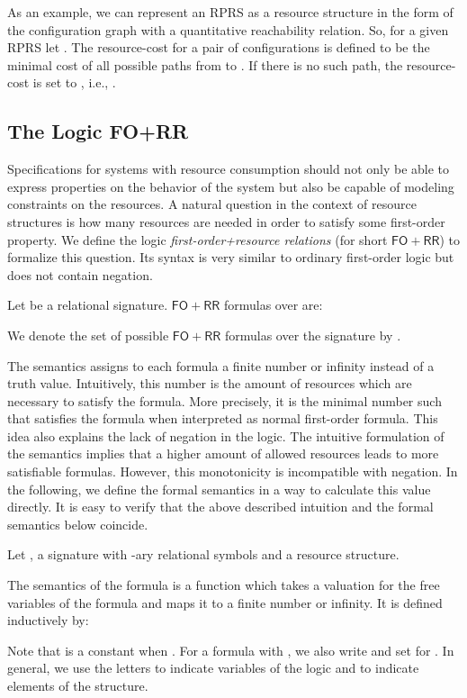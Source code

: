 \documentclass{LMCS}
\newcommand{\FORR}{\ensuremath{\mathsf{FO\!\!+\!\!RR}}}
\newcommand{\RPRS}{\textsf{RPRS}}
\begin{document}
As an example, we can represent an \RPRS{} as a resource structure in the form of
the configuration graph with a quantitative reachability relation. So, for a
given \RPRS{}  let . The
resource-cost for a pair of configurations  is defined to be the
minimal cost of all possible paths from  to . If there is no such path,
the resource-cost is set to , i.e., .


\subsection{The Logic FO+RR}
\label{subsec:LogicFORR}

Specifications for systems with resource consumption should not only be able to
express properties on the behavior of the system but also be capable of modeling
constraints on the resources. A natural question in the context of resource
structures is how many resources are needed in order to satisfy some first-order
property. We define the logic \emph{first-order+resource relations} (for short
\FORR{}) to formalize this question. Its syntax is very similar to ordinary
first-order logic but does not contain negation.

\begin{defi}[Syntax of \FORR{}]
  Let  be a  relational signature. \FORR{} formulas
  over  are:
  
  We denote the set of possible \FORR{} formulas over the signature  by
.
\end{defi}

The semantics assigns to each formula a finite number or infinity instead of a
truth value. Intuitively, this number is the amount of resources which are
necessary to satisfy the formula. More precisely, it is the minimal number 
such that  satisfies the formula when interpreted as normal
first-order formula. This idea also explains the lack of negation in the logic.
The intuitive formulation of the semantics implies that a higher amount of
allowed resources leads to more satisfiable formulas. However, this monotonicity
is incompatible with negation. In the following, we define the formal semantics
in a way to calculate this value directly. It is easy to verify that the above
described intuition and the formal semantics below coincide. 


\begin{defi}[Semantics of \FORR{}]
  Let ,  a signature with
-ary relational symbols and  a resource structure.

  The semantics  of the formula  is a function which takes a valuation for the
free variables of the formula and maps it to a finite number or infinity. It is
defined inductively by:
  
  Note that  is a constant when
. For a formula
 with , we 
also write  and set  for
. In general, we use the letters  to indicate
variables of the logic and  to indicate elements of the structure. 
\end{defi}
\end{document}
